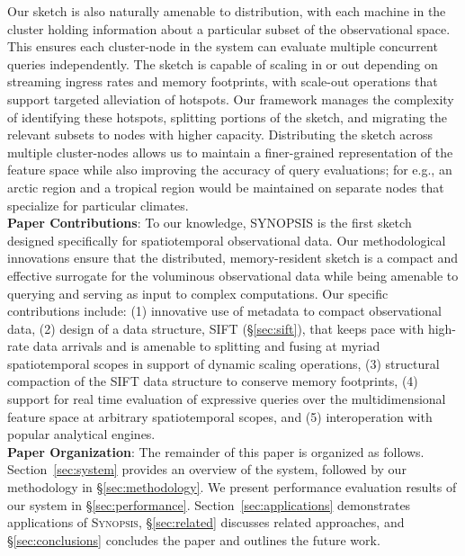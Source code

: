 Our sketch is also naturally amenable to distribution, with each machine in the cluster holding information about a particular subset of the observational space.  This ensures each cluster-node in the system can evaluate multiple concurrent queries independently. The sketch is capable of scaling in or out depending on streaming ingress rates and memory footprints, with scale-out operations that support targeted alleviation of hotspots. Our framework manages the complexity of identifying these hotspots, splitting portions of the sketch, and migrating the relevant subsets to nodes with higher capacity. Distributing the sketch across multiple cluster-nodes allows us to maintain a finer-grained representation of the feature space while also improving the accuracy of query evaluations; for e.g., an arctic region and a tropical region would be maintained on separate nodes that specialize for particular climates.
%
\vspace{0.7em}\\
%
\textbf{Paper Contributions}:
To our knowledge, SYNOPSIS is the first sketch designed specifically for spatiotemporal observational data. Our methodological innovations ensure that the distributed, memory-resident sketch is a compact and effective surrogate for the voluminous observational data while being amenable to querying and serving as input to complex computations. Our specific contributions include: (1) innovative use of metadata to compact observational data, (2) design of a data structure, SIFT (\S\ref{sec:sift}), that keeps pace with high-rate data arrivals and is amenable to splitting and fusing at myriad spatiotemporal scopes in support of dynamic scaling operations, (3) structural compaction of the SIFT data structure to conserve memory footprints, (4) support for real time evaluation of expressive queries over the multidimensional feature space at arbitrary spatiotemporal scopes, and (5) interoperation with popular analytical engines.
%
\vspace{0.7em}\\
%
\textbf{Paper Organization}:
The remainder of this paper is organized as follows. Section~\ref{sec:system} provides an overview of the system, followed by our methodology in \S\ref{sec:methodology}. We present performance evaluation results of our system in \S\ref{sec:performance}. Section~\ref{sec:applications} demonstrates applications of \textsc{Synopsis}, \S\ref{sec:related} discusses related approaches, and \S\ref{sec:conclusions} concludes the paper and outlines the future work.
